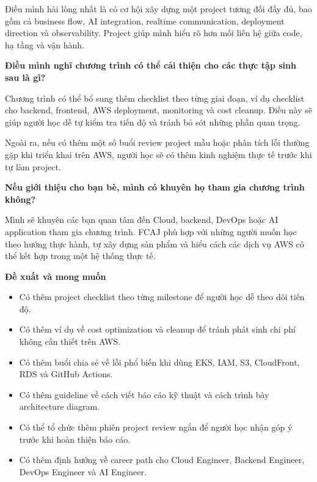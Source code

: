 Điều mình hài lòng nhất là có cơ hội xây dựng một project tương đối đầy
đủ, bao gồm cả business flow, AI integration, realtime communication,
deployment direction và observability. Project giúp mình hiểu rõ hơn mối
liên hệ giữa code, hạ tầng và vận hành.

\vspace{0.5em}\noindent\textbf{Điều mình nghĩ chương trình có thể cải thiện cho các thực
tập sinh sau là
gì?}\par

Chương trình có thể bổ sung thêm checklist theo từng giai đoạn, ví dụ
checklist cho backend, frontend, AWS deployment, monitoring và cost
cleanup. Điều này sẽ giúp người học dễ tự kiểm tra tiến độ và tránh bỏ
sót những phần quan trọng.

Ngoài ra, nếu có thêm một số buổi review project mẫu hoặc phân tích lỗi
thường gặp khi triển khai trên AWS, người học sẽ có thêm kinh nghiệm
thực tế trước khi tự làm project.

\vspace{0.5em}\noindent\textbf{Nếu giới thiệu cho bạn bè, mình có khuyên họ tham gia
chương trình
không?}\par

Mình sẽ khuyên các bạn quan tâm đến Cloud, backend, DevOps hoặc AI
application tham gia chương trình. FCAJ phù hợp với những người muốn học
theo hướng thực hành, tự xây dựng sản phẩm và hiểu cách các dịch vụ AWS
có thể kết hợp trong một hệ thống thực tế.

\vspace{0.5em}\noindent\textbf{Đề xuất và mong
muốn}\par

\begin{itemize}
\tightlist
\item
  Có thêm project checklist theo từng milestone để người học dễ theo dõi
  tiến độ.
\item
  Có thêm ví dụ về cost optimization và cleanup để tránh phát sinh chi
  phí không cần thiết trên AWS.
\item
  Có thêm buổi chia sẻ về lỗi phổ biến khi dùng EKS, IAM, S3,
  CloudFront, RDS và GitHub Actions.
\item
  Có thêm guideline về cách viết báo cáo kỹ thuật và cách trình bày
  architecture diagram.
\item
  Có thể tổ chức thêm phiên project review ngắn để người học nhận góp ý
  trước khi hoàn thiện báo cáo.
\item
  Có thêm định hướng về career path cho Cloud Engineer, Backend
  Engineer, DevOps Engineer và AI Engineer.
\end{itemize}

